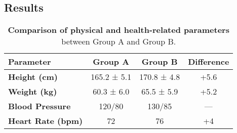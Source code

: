 \begin{adjustwidth}{0.35\textwidth}{0pt}
\section*{Results}
\lipsum[5-6]
\end{adjustwidth}

\vspace{1em}
\begin{table}[H]
\centering
\renewcommand{\arraystretch}{1.3}
\setlength{\tabcolsep}{12pt}

\begin{tabular}{>{\bfseries}l c c c}
\toprule
Parameter & Group A & Group B & Difference \\
\midrule
Height (cm)      & 165.2 ± 5.1  & 170.8 ± 4.8  & +5.6 \\
Weight (kg)      & 60.3 ± 6.0   & 65.5 ± 5.9   & +5.2 \\
Blood Pressure   & 120/80       & 130/85       & —    \\
Heart Rate (bpm) & 72           & 76           & +4   \\
\bottomrule
\end{tabular}
\caption{\textbf{Comparison of physical and health-related parameters} between Group A and Group B.}
\label{tab:results-table}
\end{table}
\vspace{1em}
